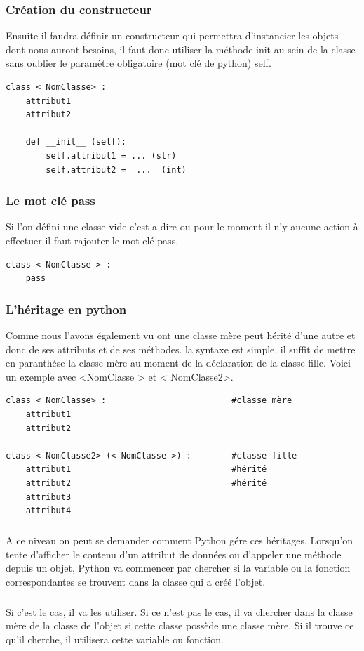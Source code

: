 \documentclass[a4paper, 12pt, twoside]{article}
\begin{document}
\subsubsection{Création du constructeur}{Ensuite il faudra définir un constructeur qui permettra d'instancier les objets dont nous auront besoins, il faut donc utiliser la méthode  \textsf{init} au sein de la classe sans oublier le paramètre obligatoire (mot clé de python) \textsf{self}. }

\begin{verbatim}
class < NomClasse> : 
    attribut1
    attribut2 

    def __init__ (self):
        self.attribut1 = ... (str)
        self.attribut2 =  ...  (int)
\end{verbatim}

\subsubsection{Le mot clé pass}{Si l'on défini une classe vide c'est a dire ou pour le moment il n'y aucune action à effectuer il faut rajouter le mot clé \textsf{pass}.}
\begin{verbatim}
class < NomClasse > : 
    pass 
\end{verbatim}
\subsubsection{L'héritage en python}{Comme nous l'avons également vu ont une classe mère peut hérité d'une autre et donc de ses attributs et de ses méthodes. la syntaxe est simple, il suffit de mettre en paranthése la classe mère au moment de la déclaration de la classe fille. Voici un exemple avec <NomClasse > et < NomClasse2>.}
\begin{verbatim}
class < NomClasse> :                         #classe mère
    attribut1
    attribut2 

class < NomClasse2> (< NomClasse >) :        #classe fille
    attribut1                                #hérité 
    attribut2                                #hérité 
    attribut3   
    attribut4
\end{verbatim}
\subparagraph{}{A ce niveau on peut se demander comment Python gére ces héritages. Lorsqu’on tente d’afficher le contenu d’un attribut de données ou d’appeler une méthode depuis un objet, Python va commencer par chercher si la variable ou la fonction correspondantes se trouvent dans la classe qui a créé l’objet.}

\subparagraph{}{Si c’est le cas, il va les utiliser. Si ce n’est pas le cas, il va chercher dans la classe mère de la classe de l’objet si cette classe possède une classe mère. Si il trouve ce qu’il cherche, il utilisera cette variable ou fonction.}
\end{document}
